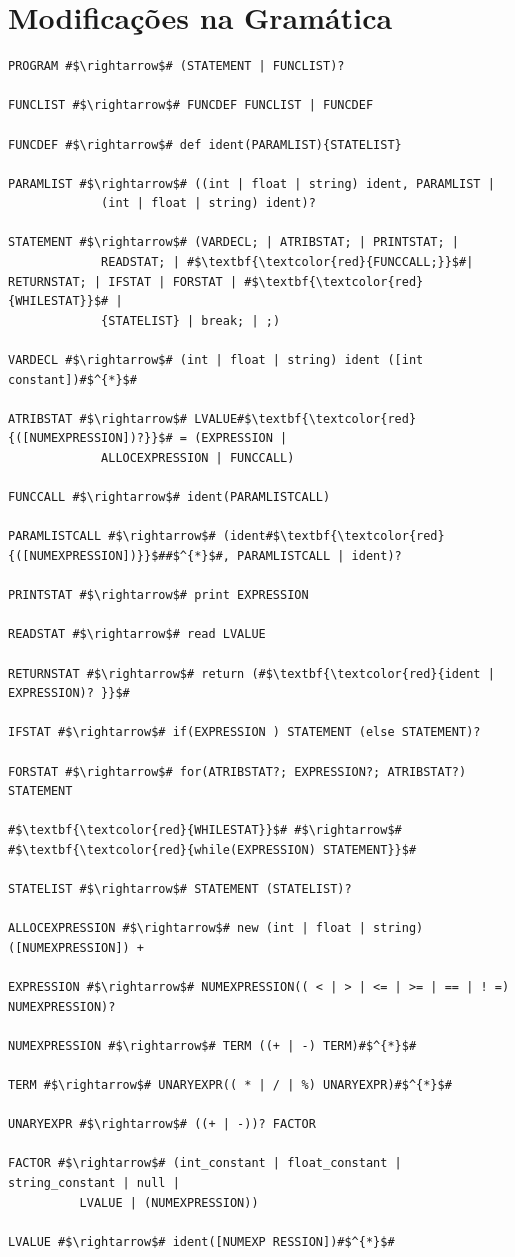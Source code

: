\documentclass[
	12pt,				%
	openright,			%
	twoside,			%
	a4paper,			%
	english,			%
	french,				%
	spanish,			%
	brazil				%
	]{abntex2}
\begin{document}
\section{Modificações na Gramática}
\begin{lstlisting}[escapechar=\#]
PROGRAM #$\rightarrow$# (STATEMENT | FUNCLIST)?  

FUNCLIST #$\rightarrow$# FUNCDEF FUNCLIST | FUNCDEF  

FUNCDEF #$\rightarrow$# def ident(PARAMLIST){STATELIST}  

PARAMLIST #$\rightarrow$# ((int | float | string) ident, PARAMLIST |
             (int | float | string) ident)?  

STATEMENT #$\rightarrow$# (VARDECL; | ATRIBSTAT; | PRINTSTAT; |
             READSTAT; | #$\textbf{\textcolor{red}{FUNCCALL;}}$#| RETURNSTAT; | IFSTAT | FORSTAT | #$\textbf{\textcolor{red}{WHILESTAT}}$# |
             {STATELIST} | break; | ;) 

VARDECL #$\rightarrow$# (int | float | string) ident ([int constant])#$^{*}$#  

ATRIBSTAT #$\rightarrow$# LVALUE#$\textbf{\textcolor{red}{([NUMEXPRESSION])?}}$# = (EXPRESSION |
             ALLOCEXPRESSION | FUNCCALL)  

FUNCCALL #$\rightarrow$# ident(PARAMLISTCALL)  

PARAMLISTCALL #$\rightarrow$# (ident#$\textbf{\textcolor{red}{([NUMEXPRESSION])}}$##$^{*}$#, PARAMLISTCALL | ident)?  

PRINTSTAT #$\rightarrow$# print EXPRESSION  

READSTAT #$\rightarrow$# read LVALUE  

RETURNSTAT #$\rightarrow$# return (#$\textbf{\textcolor{red}{ident | EXPRESSION)? }}$#

IFSTAT #$\rightarrow$# if(EXPRESSION ) STATEMENT (else STATEMENT)?  

FORSTAT #$\rightarrow$# for(ATRIBSTAT?; EXPRESSION?; ATRIBSTAT?) STATEMENT  

#$\textbf{\textcolor{red}{WHILESTAT}}$# #$\rightarrow$#  #$\textbf{\textcolor{red}{while(EXPRESSION) STATEMENT}}$#  

STATELIST #$\rightarrow$# STATEMENT (STATELIST)?  

ALLOCEXPRESSION #$\rightarrow$# new (int | float | string) ([NUMEXPRESSION]) +  

EXPRESSION #$\rightarrow$# NUMEXPRESSION(( < | > | <= | >= | == | ! =) NUMEXPRESSION)?  

NUMEXPRESSION #$\rightarrow$# TERM ((+ | -) TERM)#$^{*}$#  

TERM #$\rightarrow$# UNARYEXPR(( * | / | %) UNARYEXPR)#$^{*}$#  

UNARYEXPR #$\rightarrow$# ((+ | -))? FACTOR  

FACTOR #$\rightarrow$# (int_constant | float_constant | string_constant | null |
          LVALUE | (NUMEXPRESSION))  

LVALUE #$\rightarrow$# ident([NUMEXP RESSION])#$^{*}$# 
\end{lstlisting}
\end{document}

